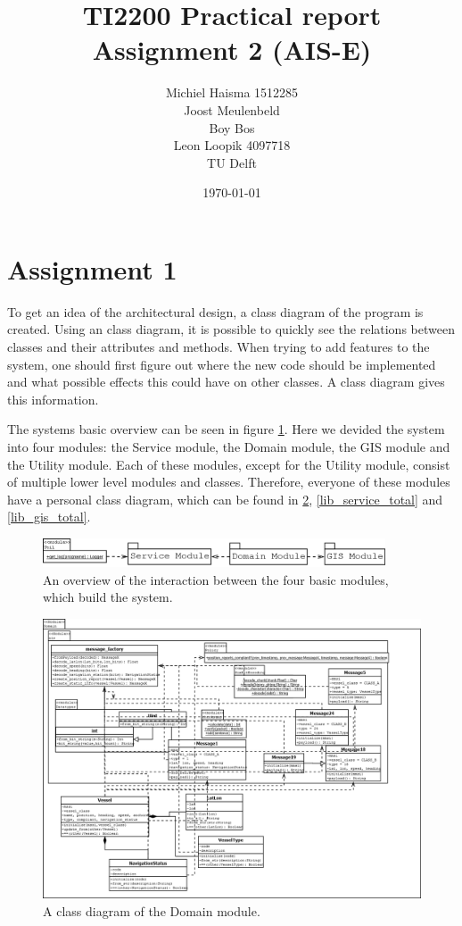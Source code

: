 \documentclass[12pt]{article}
\title{TI2200 Practical report\\
Assignment 2 (AIS-E)}
\author{Michiel Haisma 1512285\\
Joost Meulenbeld \\
Boy Bos\\
Leon Loopik 4097718\\
TU Delft\\}
\date{\today}
\begin{document}
\maketitle

\section*{Assignment 1}
To get an idea of the architectural design, a class diagram of the program is created. Using an class diagram, it is possible to quickly see the relations between classes and their attributes and methods. When trying to add features to the system, one should first figure out where the new code should be implemented and what possible effects this could have on other classes. A class diagram gives this information.

The systems basic overview can be seen in figure \ref{lib_total_overview}. Here we devided the system into four modules: the Service module, the Domain module, the GIS module and the Utility module. Each of these modules, except for the Utility module, consist of multiple lower level modules and classes. Therefore, everyone of these modules have a personal class diagram, which can be found in \ref{lib_domain_total}, \ref{lib_service_total} and \ref{lib_gis_total}.

\begin{figure}
  \centering
  \includegraphics[width=4in]{lib_total_overview}
  \caption{An overview of the interaction between the four basic modules, which build the system.}
  \label{lib_total_overview}
\end{figure}

\begin{figure}
  \centering
  \includegraphics[width=5in]{lib_domain_total}
  \caption{A class diagram of the Domain module.}
  \label{lib_domain_total}
\end{figure}
\end{document}
